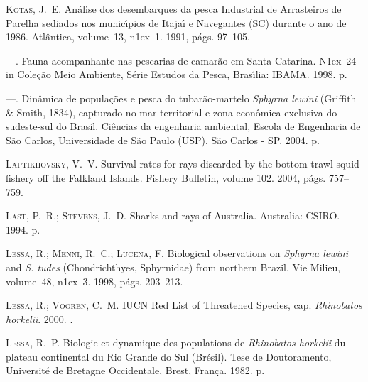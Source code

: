 \documentclass[a4paper,11pt,twoside,showtrims,onecolumn,openright,final]{memoir}
\begin{document}
\begin{thebibliography}{194}
\textsc{Kotas, J.~E.}
\newblock An\'alise dos desembarques da pesca {I}ndustrial de {A}rrasteiros de
  {P}arelha sediados nos munic\'{\i}pios de {I}taja\'{\i} e {N}avegantes ({SC})
  durante o ano de 1986.
\newblock Atl\^antica, volume~13, n\raise1ex\hbox{}~1.
  1991, p\'ags. 97--105.

---.
\newblock Fauna acompanhante nas pescarias de camar\~ao em {S}anta {C}atarina.
\newblock N\raise1ex\hbox{}~24 in Cole\c{c}\~ao Meio
  Ambiente, S\'erie Estudos da Pesca, Bras\'{\i}lia: IBAMA. 1998.
 p.

---.
\newblock Din\^amica de popula\c{c}\~oes e pesca do tubar\~ao-martelo \emph{{S}phyrna
  lewini} ({G}riffith \& {S}mith, 1834), capturado no mar territorial e zona
  econ\^omica exclusiva do sudeste-sul do {B}rasil.
\newblock Ci\^encias da engenharia ambiental, Escola de Engenharia de S\~ao
  Carlos, Universidade de S\~ao Paulo (USP), S\~ao Carlos - SP. 2004.
 p.

\textsc{Laptikhovsky, V.~V.}
\newblock Survival rates for rays discarded by the bottom trawl squid fishery
  off the {F}alkland {I}slands.
\newblock Fishery Bulletin, volume 102. 2004, p\'ags. 757--759.

\textsc{Last, P.~R.; Stevens, J.~D.}
\newblock Sharks and rays of {A}ustralia.
\newblock Australia: CSIRO. 1994.
 p.

\textsc{Lessa, R.; Menni, R.~C.; Lucena, F.}
\newblock Biological observations on \emph{{S}phyrna lewini} and \emph{{S}. tudes}
  ({C}hondrichthyes, {S}phyrnidae) from northern {B}razil.
\newblock Vie Milieu, volume~48, n\raise1ex\hbox{}~3.
  1998, p\'ags. 203--213.

\textsc{Lessa, R.; Vooren, C.~M.}
 {IUCN} {R}ed {L}ist of {T}hreatened {S}pecies, cap. \emph{Rhinobatos
  horkelii}. 2000.
.

\textsc{Lessa, R.~P.}
\newblock Biologie et dynamique des populations de \emph{{R}hinobatos horkelii} du
  plateau continental du {R}io {G}rande do {S}ul ({B}r\'esil).
\newblock Tese de Doutoramento, Universit\'e de Bretagne Occidentale, Brest,
  Fran\c{c}a. 1982.
 p.


\end{thebibliography}
\end{document}
